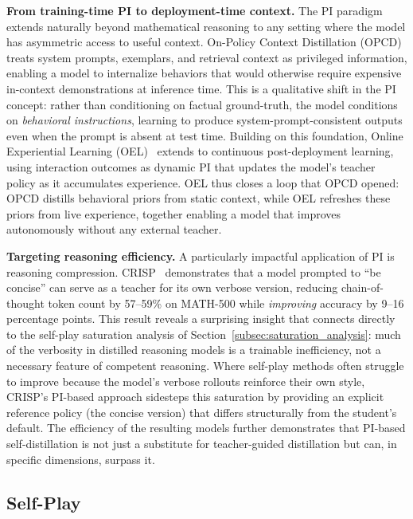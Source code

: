 \documentclass{article} %
\begin{document}
\textbf{From training-time PI to deployment-time context.}
The PI paradigm extends naturally beyond mathematical reasoning to any setting where the model has asymmetric access to useful context. On-Policy Context Distillation (OPCD)~\citep{2602.12275} treats system prompts, exemplars, and retrieval context as privileged information, enabling a model to internalize behaviors that would otherwise require expensive in-context demonstrations at inference time. This is a qualitative shift in the PI concept: rather than conditioning on factual ground-truth, the model conditions on \emph{behavioral instructions}, learning to produce system-prompt-consistent outputs even when the prompt is absent at test time. Building on this foundation, Online Experiential Learning (OEL)~\citep{2603.16856} extends to continuous post-deployment learning, using interaction outcomes as dynamic PI that updates the model's teacher policy as it accumulates experience. OEL thus closes a loop that OPCD opened: OPCD distills behavioral priors from static context, while OEL refreshes these priors from live experience, together enabling a model that improves autonomously without any external teacher.

\textbf{Targeting reasoning efficiency.}
A particularly impactful application of PI is reasoning compression. CRISP~\citep{2603.05433} demonstrates that a model prompted to ``be concise'' can serve as a teacher for its own verbose version, reducing chain-of-thought token count by 57--59\% on MATH-500 while \emph{improving} accuracy by 9--16 percentage points. This result reveals a surprising insight that connects directly to the self-play saturation analysis of Section~\ref{subsec:saturation_analysis}: much of the verbosity in distilled reasoning models is a trainable inefficiency, not a necessary feature of competent reasoning. Where self-play methods often struggle to improve because the model's verbose rollouts reinforce their own style, CRISP's PI-based approach sidesteps this saturation by providing an explicit reference policy (the concise version) that differs structurally from the student's default. The efficiency of the resulting models further demonstrates that PI-based self-distillation is not just a substitute for teacher-guided distillation but can, in specific dimensions, surpass it.


\subsection{Self-Play}
\label{subsec:self_play}
\end{document}
